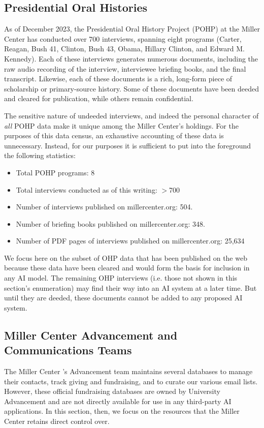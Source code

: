 \documentclass[12pt, oneside]{article}   	%
\begin{document}
\subsection{Presidential Oral Histories}\label{section.data.pohp}
As of December 2023, the Presidential Oral History Project (POHP) at the Miller Center has conducted over 700 interviews, spanning eight programs (Carter, Reagan, Bush 41, Clinton, Bush 43, Obama, Hillary Clinton, and Edward M. Kennedy).  Each of these interviews generates numerous documents, including the raw audio recording of the interview, interviewee briefing books, and the final transcript.  Likewise, each of these documents is a rich, long-form piece of scholarship or primary-source history.  Some of these documents have been deeded and cleared for publication, while others remain confidential.  

The sensitive nature of undeeded interviews, and indeed the personal character of \emph{all} POHP data make it unique among the Miller Center’s holdings.  For the purposes of this data census, an exhaustive accounting of these data is unnecessary.  Instead, for our purposes it is sufficient to put into the foreground the following statistics:
\begin{itemize}
\item Total POHP programs:  8
\item Total interviews conducted as of this writing: $>$700
\item Number  of interviews published on millercenter.org:  504.
\item Number  of briefing books published on millercenter.org: 348.
\item Number of PDF pages of interviews published on millercenter.org: 25,634
\end{itemize}
We focus here on the subset of OHP data that has been published on the web because these data have been cleared and would form the basis for inclusion in any AI model.  The remaining OHP interviews (i.e. those not shown in this section's enumeration) may find their way into an AI system at a later time.  But until they are deeded, these documents cannot be added to any proposed AI system.

 


\subsection{Miller Center Advancement and Communications Teams}\label{section.data.advancement}
The Miller Center 's Advancement team maintains several databases to manage their contacts, track giving and fundraising, and to curate our various email lists.  However, these official fundraising databases are owned by University Advancement and are not directly available for use in any third-party AI applications.  In this section, then, we focus on the   resources that the Miller Center retains direct control over.
\end{document}
